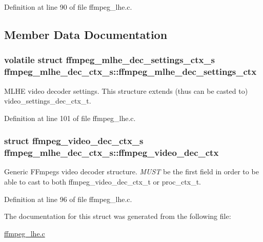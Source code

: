 Definition at line 90 of file ffmpeg\+\_\+lhe.\+c.



\subsection{Member Data Documentation}
\subsubsection[{\texorpdfstring{ffmpeg\+\_\+mlhe\+\_\+dec\+\_\+settings\+\_\+ctx}{ffmpeg_mlhe_dec_settings_ctx}}]{\setlength{\rightskip}{0pt plus 5cm}volatile struct {\bf ffmpeg\+\_\+mlhe\+\_\+dec\+\_\+settings\+\_\+ctx\+\_\+s} ffmpeg\+\_\+mlhe\+\_\+dec\+\_\+ctx\+\_\+s\+::ffmpeg\+\_\+mlhe\+\_\+dec\+\_\+settings\+\_\+ctx}\hypertarget{structffmpeg__mlhe__dec__ctx__s_a80632704c8fc88d0b7ba53e9bb7d2a5e}{}\label{structffmpeg__mlhe__dec__ctx__s_a80632704c8fc88d0b7ba53e9bb7d2a5e}
M\+L\+HE video decoder settings. This structure extends (thus can be casted to) video\+\_\+settings\+\_\+dec\+\_\+ctx\+\_\+t. 

Definition at line 101 of file ffmpeg\+\_\+lhe.\+c.

\subsubsection[{\texorpdfstring{ffmpeg\+\_\+video\+\_\+dec\+\_\+ctx}{ffmpeg_video_dec_ctx}}]{\setlength{\rightskip}{0pt plus 5cm}struct {\bf ffmpeg\+\_\+video\+\_\+dec\+\_\+ctx\+\_\+s} ffmpeg\+\_\+mlhe\+\_\+dec\+\_\+ctx\+\_\+s\+::ffmpeg\+\_\+video\+\_\+dec\+\_\+ctx}\hypertarget{structffmpeg__mlhe__dec__ctx__s_aec4e736f78cfcf59d01cafbc614aaa50}{}\label{structffmpeg__mlhe__dec__ctx__s_aec4e736f78cfcf59d01cafbc614aaa50}
Generic F\+Fmpeg\textquotesingle{}s video decoder structure. {\itshape M\+U\+ST} be the first field in order to be able to cast to both ffmpeg\+\_\+video\+\_\+dec\+\_\+ctx\+\_\+t or proc\+\_\+ctx\+\_\+t. 

Definition at line 96 of file ffmpeg\+\_\+lhe.\+c.



The documentation for this struct was generated from the following file\+:\begin{DoxyCompactItemize}
\item 
\hyperlink{ffmpeg__lhe_8c}{ffmpeg\+\_\+lhe.\+c}\end{DoxyCompactItemize}
